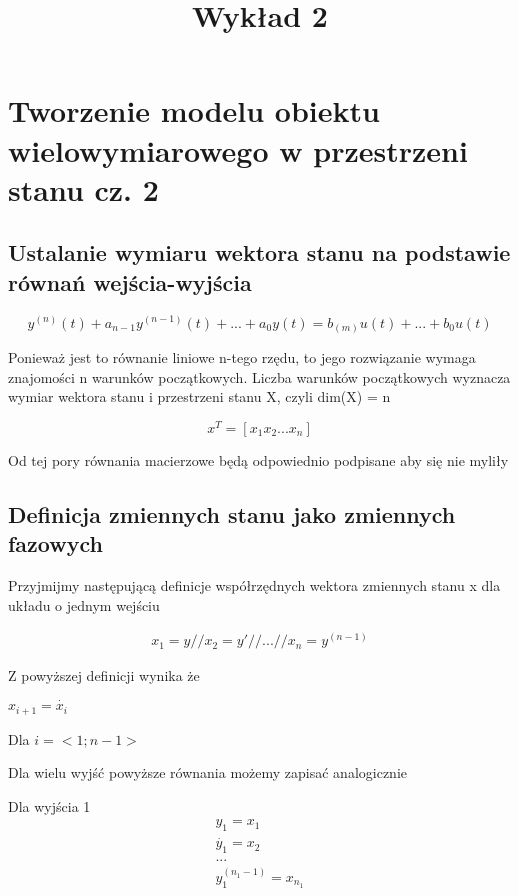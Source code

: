 \documentclass{article}
\title{Wykład 2}
\begin{document}
	\maketitle
	\section{Tworzenie modelu obiektu wielowymiarowego w przestrzeni stanu cz. 2}
	\subsection{Ustalanie wymiaru wektora stanu na podstawie równań wejścia-wyjścia}

		\begin{equation}
			y^{(n)}(t) + a_{n-1} y^{(n-1)}(t) + ... +   a_{0} y(t) = b_{(m)} u(t) + ... + b_{0} u(t)
		\end{equation}

		Ponieważ jest to równanie liniowe n-tego rzędu, to jego rozwiązanie wymaga znajomości
		n warunków początkowych. Liczba warunków początkowych wyznacza wymiar wektora stanu
		i przestrzeni stanu X, czyli dim(X) = n

		\begin{equation}
			x^{T} = [ x_{1} x_{2} ... x_{n} ]
		\end{equation}

		Od tej pory równania macierzowe będą odpowiednio podpisane aby się nie myliły

	\subsection{Definicja zmiennych stanu jako zmiennych fazowych}

		Przyjmijmy następującą definicje współrzędnych wektora zmiennych stanu x
		dla układu o jednym wejściu
		
		
			\begin{align*}
				 x_{1} = y //
				 x_{2} = y' //
				... //
				 x_{n} = y^{(n-1)} 
			\end{align*}

		Z powyższej definicji wynika że

		$ x_{i+1} = \dot{x_{i}} $

		Dla $i = <1;n-1> $

		Dla wielu wyjść powyższe równania możemy zapisać analogicznie

		Dla wyjścia 1
			\begin{align*}
				 y_{1} = x_{1} \\
				 \dot{y_{1}} = x_{2} \\
				... \\
				 y_{1}^{(n_{1}-1)} = x_{n_{1}}
			\end{align*}
\end{document}
